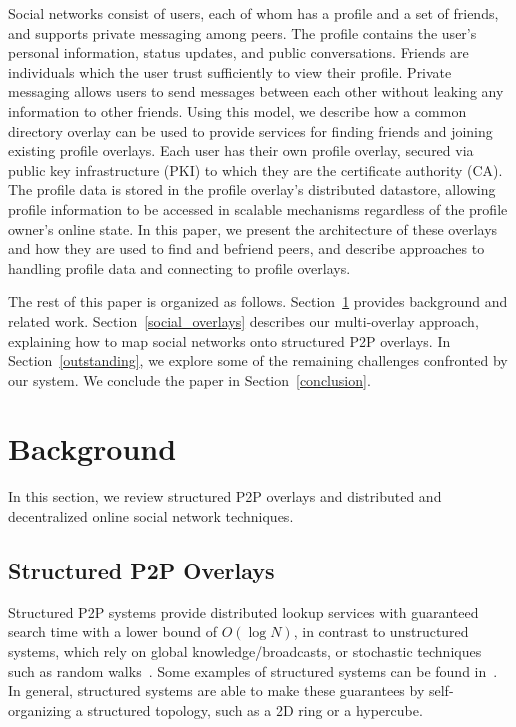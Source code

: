 \documentclass[letterpaper,twocolumn,10pt]{article}
\begin{document}
Social networks consist of users, each of whom has a profile and a set
of friends, and supports private messaging among peers.  The profile contains the user's
personal information, status updates, and public conversations.  Friends are
individuals which the user trust sufficiently to view their profile.  Private
messaging allows users to send messages between each other without leaking any
information to other friends.  Using this model, we describe how a common
directory overlay can be used to provide services for finding friends and
joining existing profile overlays.  Each user has their own profile overlay,
secured via public key infrastructure (PKI) to which they are the certificate
authority (CA).  The profile data is stored in the profile overlay's distributed
datastore, allowing profile information to be accessed in scalable mechanisms
regardless of the profile owner's online state.  In this paper, we present
the architecture of these overlays and how they are used to find and befriend
peers, and describe approaches to handling profile data and connecting to profile overlays.

The rest of this paper is organized as follows.  Section~\ref{background}
provides background and related work.  Section~\ref{social_overlays} describes
our multi-overlay approach, explaining how to map social networks onto structured
P2P overlays.  In Section~\ref{outstanding}, we explore some of the remaining
challenges confronted by our system.  We conclude the paper in
Section~\ref{conclusion}.

\section{Background}
\label{background}
In this section, we review structured P2P overlays and distributed and
decentralized online social network techniques.
\subsection{Structured P2P Overlays}
Structured P2P systems provide distributed lookup services with guaranteed
search time with a lower bound of $O(\log N)$, in contrast to unstructured
systems, which rely on global knowledge/broadcasts, or stochastic techniques
such as random walks~\cite{unstructured_v_structured}.  Some examples of
structured systems can be found in~\cite{pastry, chord, symphony, kademlia,
can}.  In general, structured systems are able to make these guarantees by
self-organizing a structured topology, such as a 2D ring or a hypercube.
\end{document}
